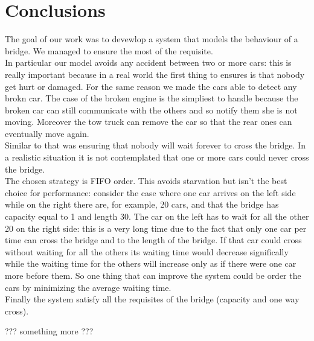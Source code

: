 \chapter{Conclusions}\label{ch:conclusions}

The goal of our work was to devewlop a system that models the behaviour of a bridge. We managed to ensure
the most of the requisite.\\ In particular our model avoids any accident between two or more cars: this is 
really important because in a real world the first thing to ensures is that nobody get hurt or damaged. 
For the same reason we made the cars able to detect any brokn car. The case of the broken engine is the simpliest
to handle because the broken car can still communicate with the others and so notify them she is not moving.
Moreover the tow truck can remove the car so that the rear ones can eventually move again.\\ Similar to that
was ensuring that nobody will wait forever to cross the bridge. In a realistic situation it is not contemplated
that one or more cars could never cross the bridge.\\
The chosen strategy is FIFO order. This avoids starvation but isn't the best choice for performance: consider
the case where one car arrives on the left side while on the right there are, for example, 20 cars, and that the bridge
has capacity equal to 1 and length 30. The car on the left has to wait for all the other 20 on the right side: this 
is a very long time due to the fact that only one car per time can cross the bridge and to the length of the bridge.
If that car could cross without waiting for all the others its waiting time would decrease significally while
the waiting time for the others will increase only as if there were one car more before them. So one thing 
that can improve the system could be order the cars by minimizing the average waiting time.\\
Finally the system satisfy all the requisites of the bridge (capacity and one way cross).

??? something more  ???